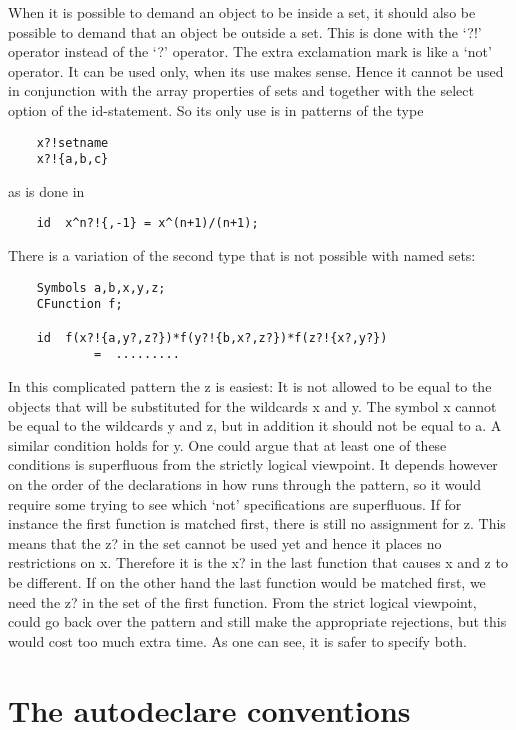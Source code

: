 When it is possible to demand an object to be inside a 
set, it should also be possible to demand that an object 
be outside a set. This is done with the `?!' operator 
instead of the `?' operator. The extra exclamation mark 
is like a `not' operator. It can be used only, when its use makes sense. 
Hence it cannot be used in conjunction with the array properties of sets 
and together with the select option of the id-statement. So its only use is 
in patterns of the type
\begin{verbatim}
    x?!setname
    x?!{a,b,c}
\end{verbatim}
as is done in
\begin{verbatim}
    id  x^n?!{,-1} = x^(n+1)/(n+1);
\end{verbatim}
There is a variation of the second type that is not possible with named 
sets:
\begin{verbatim}
    Symbols a,b,x,y,z;
    CFunction f;
    
    id  f(x?!{a,y?,z?})*f(y?!{b,x?,z?})*f(z?!{x?,y?})
            =  .........
\end{verbatim}
In this complicated pattern the z is easiest: It is not allowed to be equal 
to the objects that will be substituted for the wildcards x and y. The 
symbol x cannot be equal to the wildcards y and z, but in addition it 
should not be equal to a. A similar condition holds for y. One could argue 
that at least one of these conditions is superfluous from the strictly 
logical viewpoint. It depends however on the order of the declarations in 
how {\FORM} runs through the pattern, so it would require some trying to 
see which `not' specifications are superfluous. If for instance the first 
function is matched first, there is still no assignment for z. This means 
that the z? in the set cannot be used yet and hence it places no 
restrictions on x. Therefore it is the x? in the last function that causes 
x and z to be different. If on the other hand the last function would be 
matched first, we need the z? in the set of the first function. From the 
strict logical viewpoint, {\FORM} could go back over the pattern and still 
make the appropriate rejections, but this would cost too much extra time. 
As one can see, it is safer to specify both.

\section{The autodeclare conventions}

